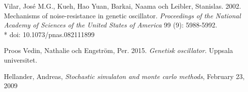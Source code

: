 \begin{thebibliography}{99}
	Vilar, José M.G., Kueh, Hao Yuan, Barkai, Naama och Leibler, Stanislas. 2002. Mechanisms of noise-resistance in genetic oscillator. \emph{Proceedings of the National Academy of Sciences of the United States of America} 99 (9): 5988-5992. \\* doi: 10.1073/pnas.082111899 
	
	Proos Vedin, Nathalie och Engström, Per. 2015. \emph{Genetisk oscillator.} Uppsala universitet.

	Hellander, Andreas, \emph{Stochastic simulaton and monte carlo methods}, February 23, 2009
\end{thebibliography}	
